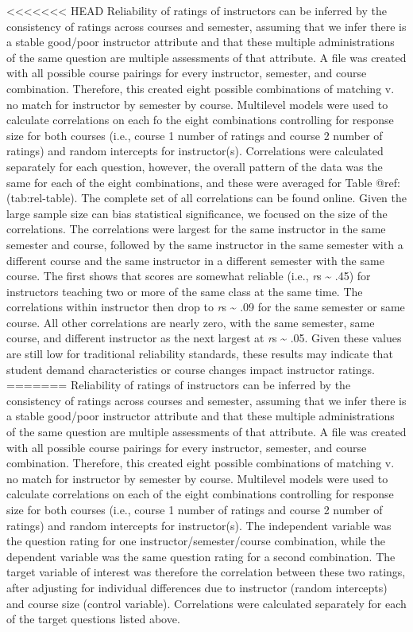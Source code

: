 \documentclass[man]{apa6}
\theoremstyle{definition}
\theoremstyle{definition}
\theoremstyle{definition}
\theoremstyle{remark}
\begin{document}
\textless{}\textless{}\textless{}\textless{}\textless{}\textless{}\textless{}
HEAD Reliability of ratings of instructors can be inferred by the
consistency of ratings across courses and semester, assuming that we
infer there is a stable good/poor instructor attribute and that these
multiple administrations of the same question are multiple assessments
of that attribute. A file was created with all possible course pairings
for every instructor, semester, and course combination. Therefore, this
created eight possible combinations of matching v. no match for
instructor by semester by course. Multilevel models were used to
calculate correlations on each fo the eight combinations controlling for
response size for both courses (i.e., course 1 number of ratings and
course 2 number of ratings) and random intercepts for instructor(s).
Correlations were calculated separately for each question, however, the
overall pattern of the data was the same for each of the eight
combinations, and these were averaged for Table @ref:(tab:rel-table).
The complete set of all correlations can be found online. Given the
large sample size can bias statistical significance, we focused on the
size of the correlations. The correlations were largest for the same
instructor in the same semester and course, followed by the same
instructor in the same semester with a different course and the same
instructor in a different semester with the same course. The first shows
that scores are somewhat reliable (i.e., \emph{r}s \textasciitilde{}
.45) for instructors teaching two or more of the same class at the same
time. The correlations within instructor then drop to \emph{r}s
\textasciitilde{} .09 for the same semester or same course. All other
correlations are nearly zero, with the same semester, same course, and
different instructor as the next largest at \emph{r}s \textasciitilde{}
.05. Given these values are still low for traditional reliability
standards, these results may indicate that student demand
characteristics or course changes impact instructor ratings. =======
Reliability of ratings of instructors can be inferred by the consistency
of ratings across courses and semester, assuming that we infer there is
a stable good/poor instructor attribute and that these multiple
administrations of the same question are multiple assessments of that
attribute. A file was created with all possible course pairings for
every instructor, semester, and course combination. Therefore, this
created eight possible combinations of matching v. no match for
instructor by semester by course. Multilevel models were used to
calculate correlations on each of the eight combinations controlling for
response size for both courses (i.e., course 1 number of ratings and
course 2 number of ratings) and random intercepts for instructor(s). The
independent variable was the question rating for one
instructor/semester/course combination, while the dependent variable was
the same question rating for a second combination. The target variable
of interest was therefore the correlation between these two ratings,
after adjusting for individual differences due to instructor (random
intercepts) and course size (control variable). Correlations were
calculated separately for each of the target questions listed above.
\end{document}
